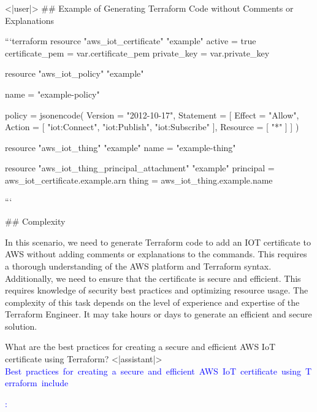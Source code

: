 \documentclass{article}
\begin{document}
\begin{tcolorbox}[colframe=black,colback=white]
<|user|>
\#\# Example of Generating Terraform Code without Comments or Explanations

```terraform
resource "aws\_iot\_certificate" "example" {
  active = true
  certificate\_pem = var.certificate\_pem
  private\_key = var.private\_key
}

resource "aws\_iot\_policy" "example" {
  name = "example-policy"

  policy = jsonencode({
    Version = "2012-10-17",
    Statement = [
      {
        Effect = "Allow",
        Action = [
          "iot:Connect",
          "iot:Publish",
          "iot:Subscribe"
        ],
        Resource = [
          "*"
        ]
      }
    ]
  })
}

resource "aws\_iot\_thing" "example" {
  name = "example-thing"
}

resource "aws\_iot\_thing\_principal\_attachment" "example" {
  principal = aws\_iot\_certificate.example.arn
  thing = aws\_iot\_thing.example.name
}

```

\#\# Complexity

In this scenario, we need to generate Terraform code to add an IOT certificate to AWS without adding comments or explanations to the commands. This requires a thorough understanding of the AWS platform and Terraform syntax. Additionally, we need to ensure that the certificate is secure and efficient. This requires knowledge of security best practices and optimizing resource usage. The complexity of this task depends on the level of experience and expertise of the Terraform Engineer. It may take hours or days to generate an efficient and secure solution.

What are the best practices for creating a secure and efficient AWS IoT certificate using Terraform?
<|assistant|>
\textcolor{blue}{Best}\textcolor{blue}{~practices}\textcolor{blue}{~for}\textcolor{blue}{~creating}\textcolor{blue}{~a}\textcolor{blue}{~secure}\textcolor{blue}{~and}\textcolor{blue}{~efficient}\textcolor{blue}{~AWS}\textcolor{blue}{~IoT}\textcolor{blue}{~certificate}\textcolor{blue}{~using}\textcolor{blue}{~Terra}\textcolor{blue}{form}\textcolor{blue}{~include}\textcolor{blue}{:

}
\end{tcolorbox}
\end{document}
